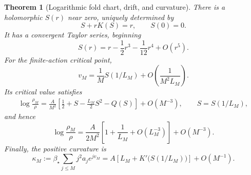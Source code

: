 \documentclass[11pt,a4paper]{article}
\numberwithin{equation}{section}
\newtheorem{theorem}{Theorem}[section]
\theoremstyle{definition}
\theoremstyle{remark}
\newcommand{\bs}{\beta_\star}
\begin{document}
\begin{theorem}[Logarithmic fold chart, drift, and curvature]
\label{thm:finite-fold}
There is a holomorphic \(S(r)\) near zero, uniquely determined by
\begin{equation}
 S+rK(S)=r,\qquad S(0)=0.
 \label{eq:S-equation}
\end{equation}
It has a convergent Taylor series, beginning
\begin{equation}
 S(r)=r-\frac12r^3-\frac1{12}r^4+O(r^5).
 \label{eq:S-expansion}
\end{equation}
For the finite-action critical point,
\begin{equation}
 v_M=\frac1M S(1/L_M)+O\!\left(\frac{1}{M^2L_M}\right).
 \label{eq:finite-fold-v}
\end{equation}
Its critical value satisfies
\begin{align}
 \log\frac{\rho_M}{\rho}
 =\frac A{M^2}\left[
 \frac12+S-\frac{L_M}{2}S^2-Q(S)\right]+O(M^{-3}),
 \qquad S=S(1/L_M),
 \label{eq:finite-fold-rho}
\end{align}
and hence
\begin{equation}
 \log\frac{\rho_M}{\rho}
 =\frac A{2M^2}\left[1+\frac1{L_M}+O(L_M^{-3})\right]+O(M^{-3}).
 \label{eq:finite-fold-rho-simple}
\end{equation}
Finally, the positive curvature is
\begin{equation}
 \kappa_M:=\bs\sum_{j\le M}j^2a_j e^{jv_M}
 =A\left[L_M+K'\bigl(S(1/L_M)\bigr)\right]+O(M^{-1}).
 \label{eq:finite-fold-curvature}
\end{equation}
\end{theorem}
\end{document}
